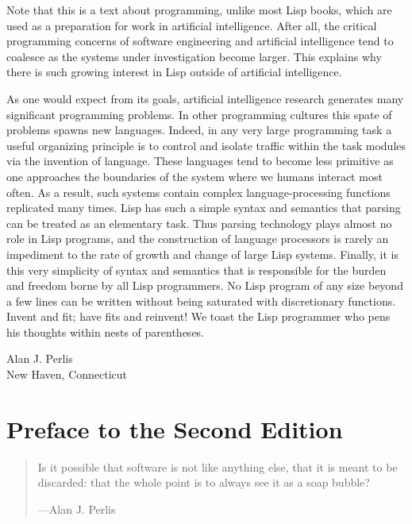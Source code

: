 Note that this is a text about programming, unlike most Lisp books, which are
used as a preparation for work in artificial intelligence.  After all, the
critical programming concerns of software engineering and artificial
intelligence tend to coalesce as the systems under investigation become larger.
This explains why there is such growing interest in Lisp outside of artificial
intelligence.

As one would expect from its goals, artificial intelligence research generates
many significant programming problems.  In other programming cultures this
spate of problems spawns new languages.  Indeed, in any very large programming
task a useful organizing principle is to control and isolate traffic within the
task modules via the invention of language.  These languages tend to become
less primitive as one approaches the boundaries of the system where we humans
interact most often.  As a result, such systems contain complex
language-processing functions replicated many times.  Lisp has such a simple
syntax and semantics that parsing can be treated as an elementary task.  Thus
parsing technology plays almost no role in Lisp programs, and the construction
of language processors is rarely an impediment to the rate of growth and change
of large Lisp systems.  Finally, it is this very simplicity of syntax and
semantics that is responsible for the burden and freedom borne by all Lisp
programmers.  No Lisp program of any size beyond a few lines can be written
without being saturated with discretionary functions.  Invent and fit; have
fits and reinvent!  We toast the Lisp programmer who pens his thoughts within
nests of parentheses.

\vspace{0.5em}
\noindent
Alan J. Perlis\\
New Haven, Connecticut

\chapter*{Preface to the Second Edition}
\label{Preface}

\begin{quote}
Is it possible that software is not like anything else, that it is meant to be
discarded: that the whole point is to always see it as a soap bubble?

---Alan J. Perlis
\end{quote}


